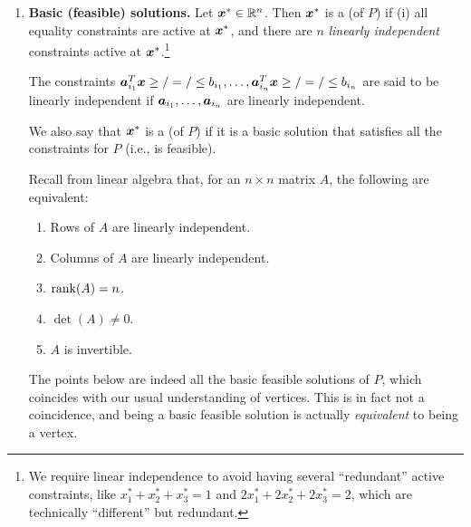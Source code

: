 \begin{enumerate}
\item \textbf{Basic (feasible) solutions.} Let \(\bm{x}^*\in\mathbb{R}^n\). Then
\(\bm{x}^*\) is a  (of \(P\)) if (i) all equality
constraints are active at \(\bm{x}^*\), and there are \(n\) \emph{linearly
independent} constraints active at \(\bm{x}^*\).\footnote{We require linear
independence to avoid having several ``redundant'' active constraints, like
\(x_1^*+x_2^*+x_3^*=1\) and \(2x_1^*+2x_2^*+2x_3^*=2\), which are technically
``different'' but redundant.}
\begin{note}
The constraints
\(\bm{a}_{i_1}^{T}\bm{x}\ge/=/\le b_{i_1},\dotsc,\bm{a}_{i_n}^{T}\bm{x}\ge/=/\le b_{i_n}\)
are said to be linearly independent if \(\bm{a}_{i_1},\dotsc,\bm{a}_{i_n}\)
are linearly independent.
\end{note}

We also say that \(\bm{x}^*\) is a  (of \(P\))
if it is a basic solution that satisfies all the constraints for \(P\) (i.e.,
is feasible).

\begin{note}
Recall from linear algebra that, for an \(n\times n\) matrix \(A\), the
following are equivalent:
\begin{enumerate}
\item Rows of \(A\) are linearly independent.
\item Columns of \(A\) are linearly independent.
\item \(\operatorname{rank}(A)=n\).
\item \(\det(A)\ne 0\).
\item \(A\) is invertible.
\end{enumerate}
\end{note}

The  points below are indeed all the basic feasible solutions of \(P\),
which coincides with our usual understanding of vertices. This is in fact not a
coincidence, and being a basic feasible solution is actually \emph{equivalent}
to being a vertex.
\begin{center}
\end{center}


\end{enumerate}
